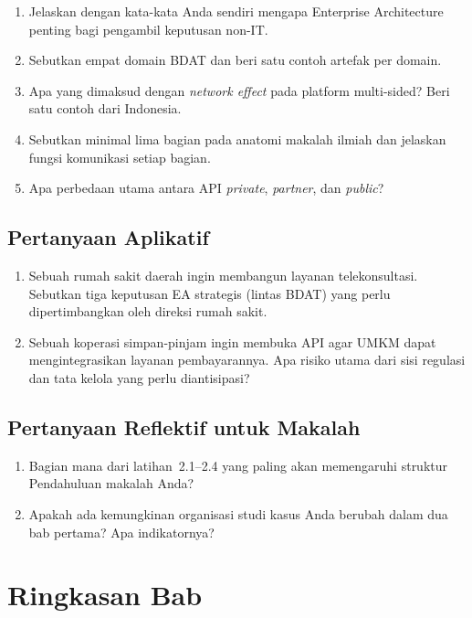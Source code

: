 \begin{enumerate}
  \item Jelaskan dengan kata-kata Anda sendiri mengapa Enterprise Architecture
        penting bagi pengambil keputusan non-IT.
  \item Sebutkan empat domain BDAT dan beri satu contoh artefak per domain.
  \item Apa yang dimaksud dengan \emph{network effect} pada platform
        multi-sided? Beri satu contoh dari Indonesia.
  \item Sebutkan minimal lima bagian pada anatomi makalah ilmiah dan jelaskan
        fungsi komunikasi setiap bagian.
  \item Apa perbedaan utama antara API \emph{private}, \emph{partner}, dan
        \emph{public}?
\end{enumerate}

\subsection*{Pertanyaan Aplikatif}

\begin{enumerate}
  \item Sebuah rumah sakit daerah ingin membangun layanan telekonsultasi.
        Sebutkan tiga keputusan EA strategis (lintas BDAT) yang perlu
        dipertimbangkan oleh direksi rumah sakit.
  \item Sebuah koperasi simpan-pinjam ingin membuka API agar UMKM dapat
        mengintegrasikan layanan pembayarannya. Apa risiko utama dari sisi
        regulasi dan tata kelola yang perlu diantisipasi?
\end{enumerate}

\subsection*{Pertanyaan Reflektif untuk Makalah}

\begin{enumerate}
  \item Bagian mana dari latihan~2.1--2.4 yang paling akan memengaruhi
        struktur Pendahuluan makalah Anda?
  \item Apakah ada kemungkinan organisasi studi kasus Anda berubah dalam dua
        bab pertama? Apa indikatornya?
\end{enumerate}

\section{Ringkasan Bab}

